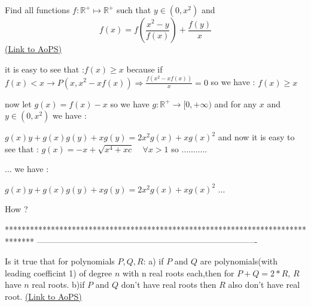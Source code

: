 \begin{problem}
	Find all functions $ f :\mathbb{R}^+\mapsto\mathbb{R}^+ $ such that $ y\in{(0,x^{2})} $ and
\[ f(x)=f(\frac{x^{2}-y}{f(x)})+\frac{f(y)}{x} \]
	\flushright \href{https://artofproblemsolving.com/community/c6h578844}{(Link to AoPS)}
\end{problem}



\begin{solution}
	it is easy to see that :$f(x)\geq x$ because if $f(x)< x\rightarrow P(x,x^{2}-xf(x))\Rightarrow \frac{f(x^{2}-xf(x))}{x}=0$
so we have : $f(x)\geq x$

now let $g(x)=f(x)-x$ so we have $g:\mathbb{R^{+}}\rightarrow  [ 0 , +\infty )$ and for any $x$ and $y\in (0,x^{2})$ we have : 

$g(x)y+g(x)g(y)+xg(y)=2x^{2}g(x)+xg(x)^{2}$ and now it is easy to see that : $g(x)=-x+\sqrt{x^{4}+xc}\:\: \: \:  \: \forall x> 1$ so ...........
\end{solution}



\begin{solution}
	\begin{tcolorbox}... we have : 

$g(x)y+g(x)g(y)+xg(y)=2x^{2}g(x)+xg(x)^{2}$ ...\end{tcolorbox}
How ?
\end{solution}



*******************************************************************************
-------------------------------------------------------------------------------

\begin{problem}
	Is it true that for  polynomials $P,Q,R$:
a) if $P$ and $Q$ are polynomials(with leading coefficint 1) of degree $n$ with n real roots each,then for $P+Q=2*R$, $R$ have $n$ real roots.
b)if $P$ and $Q$ don't have real roots then $R$ also don't have real root.
	\flushright \href{https://artofproblemsolving.com/community/c6h578944}{(Link to AoPS)}
\end{problem}



